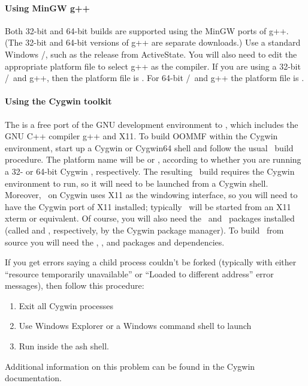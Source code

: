 \paragraph{Using MinGW g++}

Both 32-bit and 64-bit builds are supported using the MinGW ports of
g++.  (The 32-bit and 64-bit versions of g++ are separate downloads.)
Use a standard Windows \Tcl/\Tk, such as the
release from ActiveState.  You will also need to edit the appropriate
platform file to select g++ as the compiler.  If you are using a 32-bit
\Tcl/\Tk\ and g++, then the platform file is
.  For 64-bit
\Tcl/\Tk\ and g++ the platform file is
.

\paragraph{Using the Cygwin toolkit}\label{par:install.cygwin}
The  is
a free port of the GNU development environment to \Windows, which
includes the GNU C++ compiler g++ and X11.  To build OOMMF within the
Cygwin environment, start up a Cygwin or Cygwin64 shell and follow the
usual \Unix\ build procedure.  The platform name will be 
or , according to whether you are running a 32- or
64-bit Cygwin , respectively.  The resulting \OOMMF\ build
requires the Cygwin environment to run, so it will need to be launched
from a Cygwin shell.  Moreover, \OOMMF\ on Cygwin uses X11 as the
windowing interface, so you will need to have the Cygwin port of X11
installed; typically \OOMMF\ will be started from an X11 xterm or
equivalent.  Of course, you will also need the \Tcl\ and \Tk\ packages
installed (called  and , respectively, by the
Cygwin package manager).  To build \OOMMF\ from source you will
need the , , and 
packages and dependencies.

If you get errors saying a child process couldn't be forked (typically
with either ``resource temporarily unavailable'' or ``Loaded to
different address'' error messages), then follow this procedure:
\begin{enumerate}
\item Exit all Cygwin processes
\item Use Windows Explorer or a Windows command shell to launch
\item Run  inside the ash shell.
\end{enumerate}
Additional information on this problem can be found in the Cygwin
documentation.

